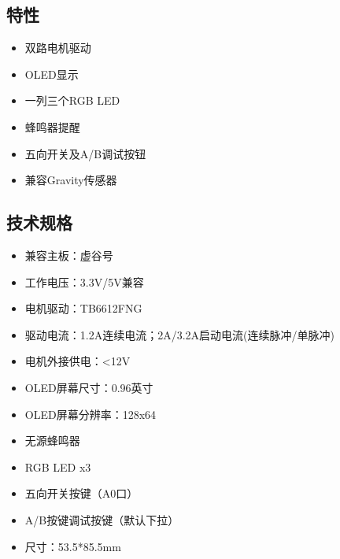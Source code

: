 \documentclass[letterpaper,10pt,english]{sphinxmanual}
\begin{document}
\subsection{特性}
\label{\detokenize{07.plus/7.1-houwu:id3}}\begin{itemize}
\item {} 
双路电机驱动

\item {} 
OLED显示

\item {} 
一列三个RGB LED

\item {} 
蜂鸣器提醒

\item {} 
五向开关及A/B调试按钮

\item {} 
兼容Gravity传感器

\end{itemize}


\subsection{技术规格}
\label{\detokenize{07.plus/7.1-houwu:id4}}\begin{itemize}
\item {} 
兼容主板：虚谷号

\item {} 
工作电压：3.3V/5V兼容

\item {} 
电机驱动：TB6612FNG

\item {} 
驱动电流：1.2A连续电流；2A/3.2A启动电流(连续脉冲/单脉冲)

\item {} 
电机外接供电：\textless{}12V

\item {} 
OLED屏幕尺寸：0.96英寸

\item {} 
OLED屏幕分辨率：128x64

\item {} 
无源蜂鸣器

\item {} 
RGB LED x3

\item {} 
五向开关按键（A0口）

\item {} 
A/B按键调试按键（默认下拉）

\item {} 
尺寸：53.5*85.5mm

\end{itemize}
\end{document}

